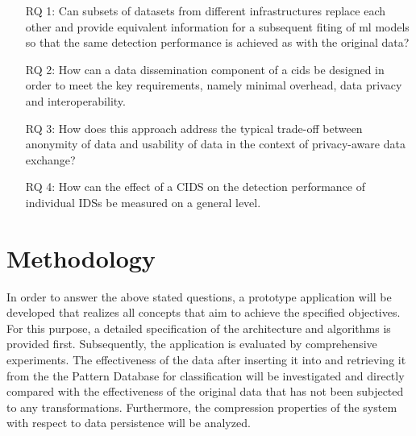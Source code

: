 \documentclass[../../main.tex]{subfiles}
\begin{document}
\begin{itemize}[leftmargin=6em]

    \item[RQ 1:] Can subsets of datasets from different infrastructures replace each other and provide equivalent information for a subsequent fiting of \gls{ml} models so that the same detection performance is achieved as with the original data? 
 
    \item[RQ 2:] How can a data dissemination component of a \gls{cids} be designed in order to meet the key requirements, namely minimal overhead, data privacy and interoperability.

    \item[RQ 3:] How does this approach address the typical trade-off between anonymity of data and usability of data in the context of privacy-aware data exchange?

    \item[RQ 4:] How can the effect of a CIDS on the detection performance of individual IDSs be measured on a general level.

  \end{itemize}

\section{Methodology}\label{sec:methodology}
In order to answer the above stated questions, a prototype application will be developed that realizes all concepts that aim to achieve the specified objectives. For this purpose, a detailed specification of the architecture and algorithms is provided first. Subsequently, the application is evaluated by comprehensive experiments. The effectiveness of the data after inserting it into and retrieving it from the the Pattern Database for classification will be investigated and directly compared with the effectiveness of the original data that has not been subjected to any transformations. Furthermore, the compression properties of the system with respect to data persistence will be analyzed.
\end{document}
